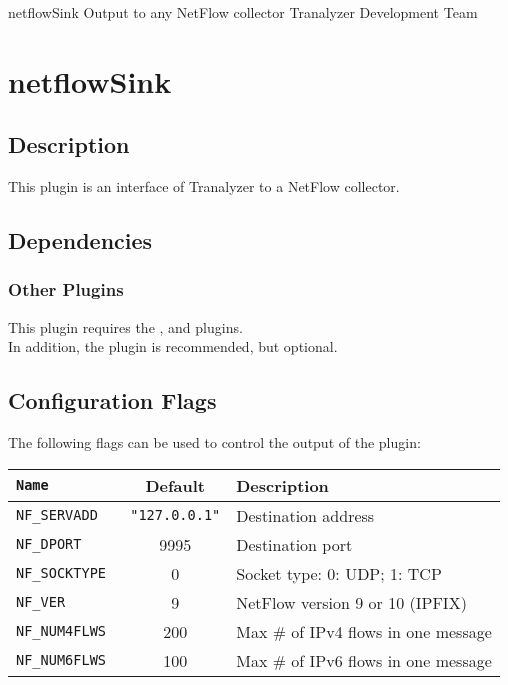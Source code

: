 \documentclass[documentation]{subfiles}
\begin{document}
\trantitle
    {netflowSink}
    {Output to any NetFlow collector}
    {Tranalyzer Development Team}

\section{netflowSink}\label{s:netflowSink}

\subsection{Description}
This plugin is an interface of Tranalyzer to a NetFlow collector.

\subsection{Dependencies}

\subsubsection{Other Plugins}
This plugin requires the ,  and  plugins.\\
In addition, the  plugin is recommended, but optional.

\subsection{Configuration Flags}
The following flags can be used to control the output of the plugin:

\begin{longtable}{>{\tt}lcl}
    \toprule
    {\bf Name} & {\bf Default} & {\bf Description}\\
    \midrule\endhead%
    NF\_SERVADD   & {\tt\small "127.0.0.1"} & Destination address\\
    NF\_DPORT     & 9995                    & Destination port\\
    NF\_SOCKTYPE  & 0                       & Socket type: 0: UDP; 1: TCP\\
    NF\_VER       & 9                       & NetFlow version 9 or 10 (IPFIX)\\
    NF\_NUM4FLWS  & 200                     & Max \# of IPv4 flows in one message\\
    NF\_NUM6FLWS  & 100                     & Max \# of IPv6 flows in one message\\
    \bottomrule
\end{longtable}
\end{document}
